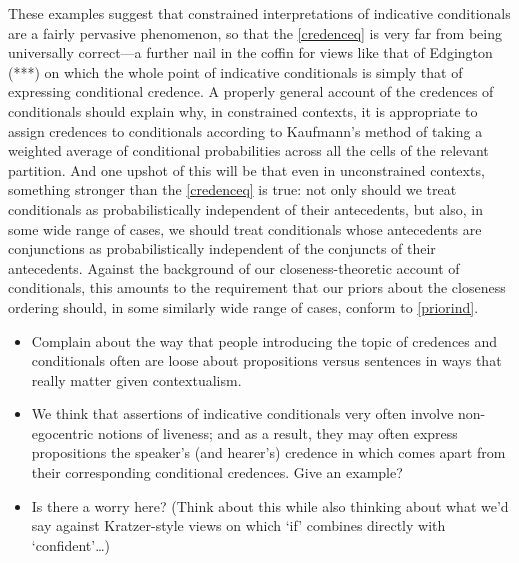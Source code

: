 \documentclass[If.tex]{subfiles}
\begin{document}
These examples suggest that constrained interpretations of indicative conditionals are a fairly pervasive phenomenon, so that the \ref{credenceq} is very far from being universally correct---a further nail in the coffin for views like that of Edgington (***) on which the whole point of indicative conditionals is simply that of expressing conditional credence.  A properly general account of the credences of conditionals should explain why, in constrained contexts, it is appropriate to assign credences to conditionals according to Kaufmann's method of taking a weighted average of conditional probabilities across all the cells of the relevant partition.  And one upshot of this will be that even in unconstrained contexts, something stronger than the \ref{credenceq} is true: not only should we treat conditionals as probabilistically independent of their antecedents, but also, in some wide range of cases, we should treat conditionals whose antecedents are conjunctions as probabilistically independent of the conjuncts of their antecedents.  Against the background of our closeness-theoretic account of conditionals, this amounts to the requirement that our priors about the closeness ordering should, in some similarly wide range of cases, conform to \ref{priorind}.  

\begin{itemize}
	\item
	Complain about the way that people introducing the topic of credences and conditionals often are loose about propositions versus sentences in ways that really matter given contextualism.  
	\item
	We think that assertions of indicative conditionals very often involve non-egocentric notions of liveness; and as a result, they may often express propositions the speaker's (and hearer's) credence in which comes apart from their corresponding conditional credences.  Give an example?  
	\item
	Is there a worry here?  (Think about this while also thinking about what we'd say against Kratzer-style views on which ‘if’ combines directly with ‘confident’…)  
\end{itemize}
\end{document}
